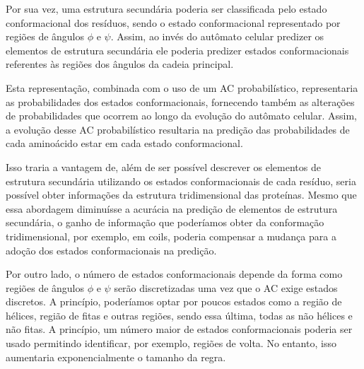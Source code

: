 Por sua vez, uma estrutura secundária poderia ser classificada pelo estado conformacional dos resíduos, sendo o estado conformacional representado por regiões de ângulos $\phi$ e $\psi$. Assim, ao invés do autômato celular predizer os elementos de estrutura secundária ele poderia predizer estados conformacionais referentes às regiões dos ângulos da cadeia principal.

Esta representação, combinada com o uso de um AC probabilístico, representaria as probabilidades dos estados conformacionais, fornecendo também as alterações de probabilidades que ocorrem ao longo da evolução do autômato celular. Assim, a evolução desse AC probabilístico resultaria na predição das probabilidades de cada aminoácido estar em cada estado conformacional.

Isso traria a vantagem de, além de ser possível descrever os elementos de estrutura secundária utilizando os estados conformacionais de cada resíduo, seria possível obter informações da estrutura tridimensional das proteínas. Mesmo que essa abordagem diminuísse a acurácia na predição de elementos de estrutura secundária, o ganho de informação que poderíamos obter da conformação tridimensional, por exemplo, em coils, poderia compensar a mudança para a adoção dos estados conformacionais na predição.

Por outro lado, o número de estados conformacionais depende da forma como regiões de ângulos $\phi$ e $\psi$ serão discretizadas uma vez que o AC exige estados discretos. A princípio, poderíamos optar por poucos estados como a região de hélices, região de fitas e outras regiões, sendo essa última, todas as não hélices e não fitas. A princípio, um número maior de estados conformacionais poderia ser usado permitindo identificar, por exemplo, regiões de volta. No entanto, isso aumentaria exponencialmente o tamanho da regra.





